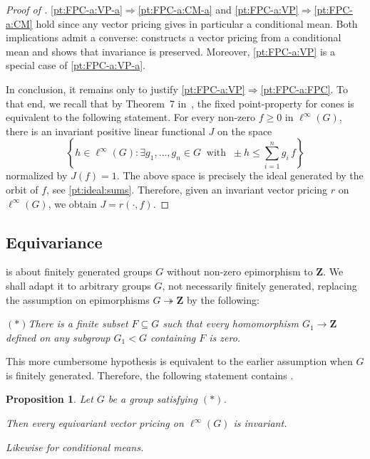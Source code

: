 \documentclass[11pt]{amsart}
\numberwithin{equation}{section}
\newtheorem{prop}[thm]{Proposition}
\theoremstyle{definition}
\theoremstyle{definition}
\newcommand*{\ZZ}{\mathbf{Z}}
\newcommand*{\se}{\subseteq}
\begin{document}
\begin{proof}[Proof of ]
\medskip
\ref{pt:FPC-a:VP-a}$\Longrightarrow$\ref{pt:FPC-a:CM-a} and \ref{pt:FPC-a:VP}$\Longrightarrow$\ref{pt:FPC-a:CM} hold since any vector pricing gives in particular a conditional mean. Both implications admit a converse:  constructs a vector pricing from a conditional mean and  shows that invariance is preserved. Moreover, \ref{pt:FPC-a:VP} is a special case of \ref{pt:FPC-a:VP-a}.

\smallskip
In conclusion, it remains only to justify \ref{pt:FPC-a:VP}$\Longrightarrow$\ref{pt:FPC-a:FPC}. To that end, we recall that by Theorem~7 in~\cite{Monod_cones}, the fixed point-property for cones is equivalent to the following statement. For every non-zero $f\geq 0$ in $\ell^\infty(G)$, there is an invariant positive linear functional $J$ on the space
\begin{equation*}
\left\{ h \in \ell^\infty(G) : \exists g_1, \ldots, g_n\in G \ \text{ with } \ \pm h \leq \sum_{i=1}^n g_i\, f \right\}
\end{equation*}
normalized by $J(f)=1$. The above space is precisely the ideal generated by the orbit of $f$, see \ref{pt:ideal:sums}. Therefore, given an invariant vector pricing $r$ on $\ell^\infty(G)$, we obtain $J=r(\cdot, f)$.
\end{proof}



\subsection{Equivariance}%
 is about finitely generated groups $G$ without non-zero epimorphism to $\ZZ$. We shall adapt it to arbitrary groups $G$, not necessarily finitely generated, replacing the assumption on epimorphisms $G\twoheadrightarrow\ZZ$ by the following:

$(*)$\itshape There is a finite subset $F\se G$ such that every homomorphism $G_1\to\ZZ$ defined on any subgroup $G_1<G$ containing $F$ is zero.

\smallskip\upshape
This more cumbersome hypothesis is equivalent to the earlier assumption when $G$ is finitely generated. Therefore, the following statement contains .


\begin{prop}\label{prop:indicable}
Let $G$ be a group satisfying $(*)$.

Then every equivariant vector pricing on $\ell^\infty(G)$ is invariant. 

Likewise for conditional means.
\end{prop}
\end{document}
